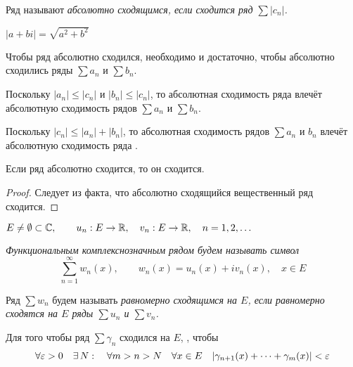 \begin{definition}
	Ряд  называют \it{абсолютно сходящимся}, если сходится ряд $ \sum |c_n| $.
\end{definition}

\begin{remind}
	$ |a + bi| = \sqrt{a^2 + b^2} $
\end{remind}

\begin{statement}
	Чтобы ряд  абсолютно сходился, необходимо и достаточно, чтобы абсолютно сходились ряды $ \sum a_n $ и $ \sum b_n $.
\end{statement}

\begin{iproof}
	\item Поскольку $ |a_n| \le |c_n| $ и $ |b_n| \le |c_n| $, то абсолютная сходимость ряда  влечёт абсолютную сходимость рядов $ \sum a_n $ и $ \sum b_n $.

	\item Поскольку $ |c_n| \le |a_n| + |b_n| $, то абсолютная сходимость рядов $ \sum a_n $ и $ b_n $ влечёт абсолютную сходимость ряда .
\end{iproof}

\begin{implication}
	Если ряд  абсолютно сходится, то он сходится.
\end{implication}

\begin{proof}
	Следует из факта, что абсолютно сходящийся вещественный ряд сходится.
\end{proof}

\begin{definition}
	$ E \ne \emptyset \subset \mathbb{C}, \qquad u_n : E \to \mathbb{R}, \quad v_n : E \to \mathbb{R}, \quad n = 1, 2, \dots $

	\it{Функциональным комплекснозначным рядом} будем называть символ
	$$ \sum_{n = 1}^\infty w_n(x), \qquad w_n(x) = u_n(x) + iv_n(x), \quad x \in E $$
\end{definition}

\begin{definition}
	Ряд $ \sum w_n $ будем называть \it{равномерно сходящимся} на $ E $, если равномерно сходятся на $ E $ ряды $ \sum u_n $ и $ \sum v_n $.
\end{definition}

\begin{theorem}
	Для того чтобы ряд $ \sum \gamma_n $  сходился на $ E $, , чтобы
	$$ \forall \varepsilon > 0 \quad \exists\, N : \quad \forall m > n > N \quad \forall x \in E \quad |\gamma_{n + 1}(x) + \dots + \gamma_m(x)| < \varepsilon $$
\end{theorem}

